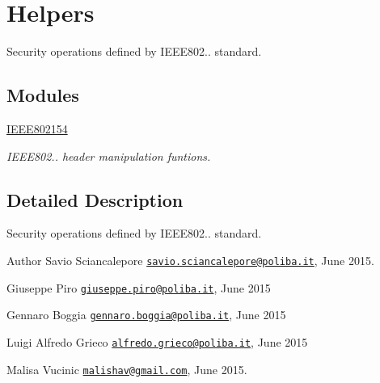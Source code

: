 \hypertarget{group__helpers}{}\section{Helpers}
\label{group__helpers}


Security operations defined by I\+E\+E\+E802.. standard.  


\subsection*{Modules}
\begin{DoxyCompactItemize}
\item 
\hyperlink{group___i_e_e_e802154}{I\+E\+E\+E802154}
\begin{DoxyCompactList}\small\item\em I\+E\+E\+E802.. header manipulation funtions. \end{DoxyCompactList}\end{DoxyCompactItemize}


\subsection{Detailed Description}
Security operations defined by I\+E\+E\+E802.. standard. 

\begin{DoxyAuthor}{Author}
Savio Sciancalepore \href{mailto:savio.sciancalepore@poliba.it}{\tt savio.\+sciancalepore@poliba.\+it}, June 2015. 

Giuseppe Piro \href{mailto:giuseppe.piro@poliba.it}{\tt giuseppe.\+piro@poliba.\+it}, June 2015 

Gennaro Boggia \href{mailto:gennaro.boggia@poliba.it}{\tt gennaro.\+boggia@poliba.\+it}, June 2015 

Luigi Alfredo Grieco \href{mailto:alfredo.grieco@poliba.it}{\tt alfredo.\+grieco@poliba.\+it}, June 2015 

Malisa Vucinic \href{mailto:malishav@gmail.com}{\tt malishav@gmail.\+com}, June 2015. 
\end{DoxyAuthor}
